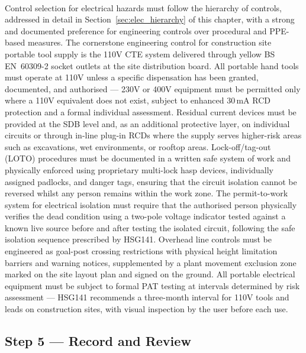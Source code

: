 \paragraph{}
Control selection for electrical hazards must follow the hierarchy of controls, addressed in detail in Section~\ref{sec:elec_hierarchy} of this chapter, with a strong and documented preference for engineering controls over procedural and PPE-based measures. The cornerstone engineering control for construction site portable tool supply is the 110V CTE system delivered through yellow BS EN~60309-2 socket outlets at the site distribution board. All portable hand tools must operate at 110V unless a specific dispensation has been granted, documented, and authorised --- 230V or 400V equipment must be permitted only where a 110V equivalent does not exist, subject to enhanced 30\,mA RCD protection and a formal individual assessment. Residual current devices must be provided at the SDB level and, as an additional protective layer, on individual circuits or through in-line plug-in RCDs where the supply serves higher-risk areas such as excavations, wet environments, or rooftop areas. Lock-off/tag-out (LOTO) procedures must be documented in a written safe system of work and physically enforced using proprietary multi-lock hasp devices, individually assigned padlocks, and danger tags, ensuring that the circuit isolation cannot be reversed whilst any person remains within the work zone. The permit-to-work system for electrical isolation must require that the authorised person physically verifies the dead condition using a two-pole voltage indicator tested against a known live source before and after testing the isolated circuit, following the safe isolation sequence prescribed by HSG141. Overhead line controls must be engineered as goal-post crossing restrictions with physical height limitation barriers and warning notices, supplemented by a plant movement exclusion zone marked on the site layout plan and signed on the ground. All portable electrical equipment must be subject to formal PAT testing at intervals determined by risk assessment --- HSG141 recommends a three-month interval for 110V tools and leads on construction sites, with visual inspection by the user before each use.

\subsection{Step 5 --- Record and Review}

